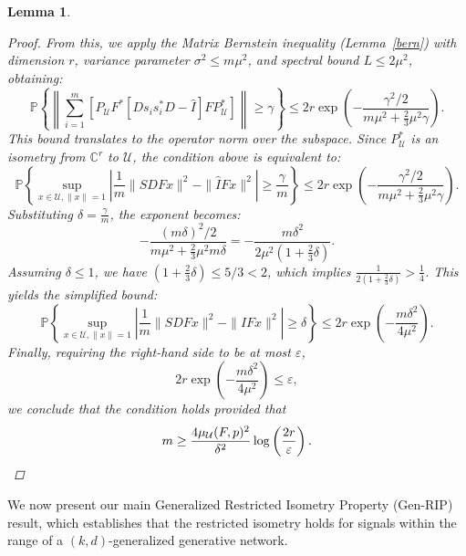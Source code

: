 \documentclass[a4paper,oneside]{amsart}
\newtheorem{lemma}[theorem]{Lemma}
\begin{document}
\begin{lemma}
\begin{proof}
From this, we apply the Matrix Bernstein inequality (Lemma~\ref{bern}) with dimension $r$, variance parameter $\sigma^2 \leq m\mu^2$, and spectral bound $L \leq 2\mu^2$, obtaining:
\begin{equation*}
    \mathbb{P}\left\{\left\|\sum_{i=1}^m\left[P_{\mathcal{U}} F^* \left[ D s_i s_i^* D - \hat{I} \right]F P_{\mathcal{U}}^*\right]\right\| \geq \gamma \right\} \leq 2 r \exp \left(-\frac{\gamma^2 / 2} {m\mu^2 + \frac{2}{3} \mu^2 \gamma}\right).
\end{equation*}
This bound translates to the operator norm over the subspace. Since $P_{\mathcal{U}}^*$ is an isometry from $\mathbb{C}^r$ to $\mathcal{U}$, the condition above is equivalent to:
\begin{equation*}
    \mathbb{P}\left\{\sup _{{x} \in \mathcal{U}, \|x\|=1}\left|\frac{1}{m}\|SDF{x}\|^2- \| \hat{I} F {x}\|^2 \right| \geq \frac{\gamma}{m} \right\} \leq 2 r \exp \left(-\frac{\gamma^2 / 2} {m\mu^2 + \frac{2}{3} \mu^2 \gamma}\right).
\end{equation*}
Substituting $\delta = \frac{\gamma}{m}$, the exponent becomes:
\begin{equation*}
    -\frac{(m\delta)^2 / 2} {m\mu^2 + \frac{2}{3} \mu^2 m\delta} = -\frac{m\delta^2 } {2\mu^2 (1+ \frac{2}{3} \delta)}.
\end{equation*}
Assuming $\delta \leq 1$, we have $(1+\frac{2}{3}\delta) \leq 5/3 < 2$, which implies $\frac{1}{2(1+\frac{2}{3}\delta)} > \frac{1}{4}$. This yields the simplified bound:
\begin{equation*}
    \mathbb{P}\left\{\sup _{{x} \in \mathcal{U}, \|x\|=1}\left|\frac{1}{m}\|SDF{x}\|^2- \| \hat{I} F {x}\|^2 \right| \geq \delta \right\} \leq 2 r \exp \left(-\frac{m\delta^2 } {4\mu^2 }\right).
\end{equation*}
Finally, requiring the right-hand side to be at most $\varepsilon$,
\begin{equation*}
    2 r \exp \left(-\frac{m\delta^2 } {4\mu^2 }\right) \leq \varepsilon,
\end{equation*}
we conclude that the condition holds provided that
\begin{equation*}
    m \geq \frac{4\mu_{\mathcal{U}}(F,p)^2}{\delta^2}\log\left( \frac{2r}{\varepsilon}\right). \qedhere
\end{equation*}
    \end{proof}
\end{lemma}
We now present our main Generalized Restricted Isometry Property (Gen-RIP) result, which establishes that the restricted isometry holds for signals within the range of a $(k,d)$-generalized generative network.
\end{document}
